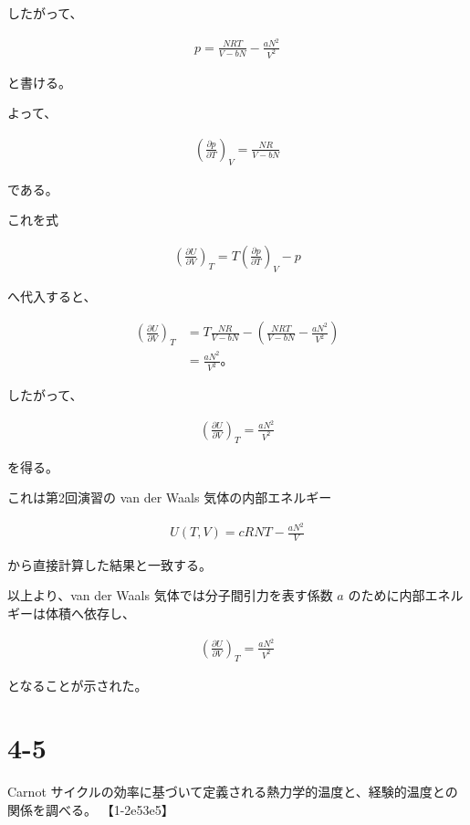 \documentclass[platex,dvipdfmx,a4paper]{jsarticle}
\begin{document}
したがって、

\begin{align*}
p
=
\frac{NRT}{V-bN}
-\frac{aN^2}{V^2}
\end{align*}

と書ける。

よって、

\begin{align*}
\left(
\frac{\partial p}{\partial T}
\right)_V
=
\frac{NR}{V-bN}
\end{align*}

である。

これを式

\begin{align*}
\left(
\frac{\partial U}{\partial V}
\right)_T
=
T
\left(
\frac{\partial p}{\partial T}
\right)_V
-p
\end{align*}

へ代入すると、

\begin{align*}
\left(
\frac{\partial U}{\partial V}
\right)_T
&=
T
\frac{NR}{V-bN}
-
\left(
\frac{NRT}{V-bN}
-\frac{aN^2}{V^2}
\right) \\
&=
\frac{aN^2}{V^2}。
\end{align*}

したがって、

\begin{align*}
\left(
\frac{\partial U}{\partial V}
\right)_T
=
\frac{aN^2}{V^2}
\end{align*}

を得る。

これは第2回演習の van der Waals 気体の内部エネルギー

\begin{align*}
U(T,V)
=
cRNT-\frac{aN^2}{V}
\end{align*}

から直接計算した結果と一致する。

以上より、van der Waals 気体では分子間引力を表す係数 $a$ のために内部エネルギーは体積へ依存し、

\begin{align*}
\left(
\frac{\partial U}{\partial V}
\right)_T
=
\frac{aN^2}{V^2}
\end{align*}

となることが示された。
\section{4-5}

Carnot サイクルの効率に基づいて定義される熱力学的温度と、経験的温度との関係を調べる。 【1-2e53e5】
\end{document}
